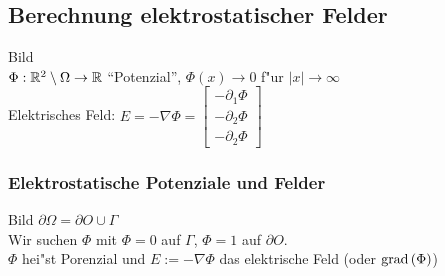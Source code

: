 \documentclass{scrartcl}
\begin{document}
\subsection{Berechnung elektrostatischer Felder}
Bild \\
$\Phi: \mathbb{R}^2 \setminus \Omega \rightarrow \mathbb{R}$ "`Potenzial"', 
$\Phi(x) \rightarrow 0$ f"ur $\vert x \vert \rightarrow \infty$ \\
Elektrisches Feld: $E = - \nabla \Phi = \left[ \begin{array}{c} - \partial_1 \Phi \\ - \partial_2 \Phi \\ - \partial_2 \Phi \end{array} \right]$

\subsubsection{Elektrostatische Potenziale und Felder}
Bild 
$\partial \Omega = \partial O \cup \Gamma$ \\
Wir suchen $\Phi$ mit $\Phi = 0$ auf $\Gamma$, $\Phi = 1$ auf $\partial O$. \\
$\Phi$ hei"st Porenzial und $E := - \nabla \Phi$ das elektrische Feld (oder $\mathrm{grad} \,(\Phi)$)
\end{document}
